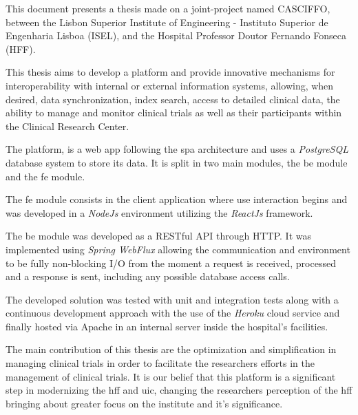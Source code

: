 \abstractEN %
This document presents a thesis made on a joint-project named CASCIFFO, between the Lisbon Superior Institute of Engineering - Instituto Superior de Engenharia Lisboa (ISEL), and the Hospital Professor Doutor Fernando Fonseca (HFF). 

This thesis aims to develop a platform and provide innovative mechanisms for interoperability with internal or external information systems, allowing, when desired, data synchronization, index search, access to detailed clinical data, the ability to manage and monitor clinical trials as well as their participants within the Clinical Research Center. 

The platform, is a web app following the \acrfull{spa} architecture and uses a \textit{PostgreSQL} database system to store its data. It is split in two main modules, the \acrfull{be} module and the \acrfull{fe} module. 

The \acrshort{fe} module consists in the client application where use interaction begins and was developed in a \textit{NodeJs} environment utilizing the \textit{ReactJs} framework. 

The \acrshort{be} module was developed as a RESTful API through HTTP. It was implemented using \textit{Spring WebFlux} allowing the communication and environment to be fully non-blocking I/O from the moment a request is received, processed and a response is sent, including any possible database access calls.

The developed solution was tested with unit and integration tests along with a continuous development approach with the use of the \textit{Heroku} cloud service and finally hosted via Apache in an internal server inside the hospital's facilities.

The main contribution of this thesis are the optimization and simplification in managing clinical trials in order to facilitate the researchers efforts in the management of clinical trials.
It is our belief that this platform is a significant step in modernizing the \acrshort{hff} and \acrshort{uic}, changing the researchers perception of the \acrshort{hff} bringing about greater focus on the institute and it's significance.


